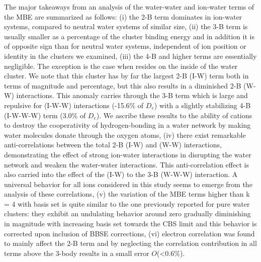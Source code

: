 \documentclass[11pt, proquest]{uwthesis}[2020/02/24]
\let\ce\ch
\begin{document}
\par The major takeaways from an analysis of the water-water and ion-water terms of the MBE are summarized as follows: (i) the 2-B term dominates in ion-water systems, compared to neutral water systems of similar size, (ii) the 3-B term is usually smaller as a percentage of the cluster binding energy and in addition it is of opposite sign than for neutral water systems, independent of ion position or identity in the clusters we examined, (iii) the 4-B and higher terms are essentially negligible. The exception is the case when \ce{Li^+} resides on the inside of the water cluster. We note that this cluster has by far the largest 2-B (I-W) term both in terms of magnitude and percentage, but this also results in a diminished 2-B (W-W) interactions. This anomaly carries through the 3-B term which is large and repulsive for (I-W-W) interactions (-15.6\% of $D_e$) with a slightly stabilizing 4-B (I-W-W-W) term (3.0\% of $D_e$). We ascribe these results to the ability of cations to destroy the cooperativity of hydrogen-bonding in a water network by making water molecules donate through the oxygen atoms, (iv) there exist remarkable anti-correlations between the total 2-B (I-W) and (W-W) interactions, demonstrating the effect of strong ion-water interactions in disrupting the water network and weaken the water-water interactions. This anti-correlation effect is also carried into the effect of the (I-W) to the 3-B (W-W-W) interaction. A universal behavior for all ions considered in this study seems to emerge from the analysis of these correlations, (v) the variation of the MBE terms higher than k = 4 with basis set is quite similar to the one previously reported for pure water clusters: they exhibit an undulating behavior around zero gradually diminishing in magnitude with increasing basis set towards the CBS limit and this behavior is corrected upon inclusion of BBSE corrections, (vi) electron correlation was found to mainly affect the 2-B term and by neglecting the correlation contribution in all terms above the 3-body results in a small error $O$(\textless 0.6\%).
\end{document}

